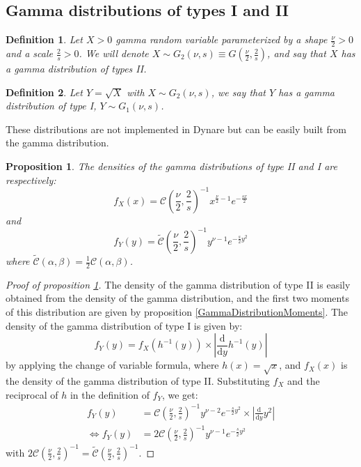 \documentclass{amsart}
\theoremstyle{plain}
\newtheorem{proposition}{Proposition}[section]
\newtheorem{definition}{Definition}[section]
\theoremstyle{remark}
\numberwithin{equation}{section}
\begin{document}
\subsection{Gamma distributions of types I and II}\label{subsec:GammaDistributionTypes}

\begin{definition}
  Let $X>0$ gamma random variable parameterized by a shape
  $\frac{\nu}{2}>0$ and a scale $\frac{2}{s}>0$. We will denote
  $X\sim G_2(\nu, s) \equiv G\left(\frac{\nu}{2}, \frac{2}{s}\right)$,
  and say that $X$ has a gamma distribution of types II.
\end{definition}

\begin{definition}
  Let $Y = \sqrt{X}$ with $X\sim G_2(\nu, s)$, we say that $Y$ has a
  gamma distribution of type I, $Y\sim G_1(\nu, s)$.
\end{definition}

These distributions are not implemented in Dynare but can be easily built from the gamma distribution.

 \begin{proposition}
   \label{GammaDistribution:type1and2:densities}
   The densities of the gamma distributions of type II and I are respectively:
   \[
     f_X(x) = \mathcal C\left(\frac{\nu}{2},\frac{2}{s}\right)^{-1}x^{\frac{\nu}{2}-1}e^{-\frac{sx}{2}}
   \]
   and
   \[
     f_Y(y) = \widetilde{\mathcal C}\left(\frac{\nu}{2},\frac{2}{s}\right)^{-1}y^{\nu-1}e^{-\frac{s}{2}y^2}
   \]
   where $\widetilde{\mathcal C}(\alpha,\beta) = \frac{1}{2}\mathcal C(\alpha,\beta)$.
 \end{proposition}

\begin{proof}[Proof of proposition \ref{GammaDistribution:type1and2:densities}]
  The density of the gamma distribution of type II is easily obtained
  from the density of the gamma distribution, and the first two
  moments of this distribution are given by proposition
  \ref{GammaDistributionMoments}. The density of the gamma
  distribution of type I is given by:
  \[
    f_Y(y) = f_X\left(h^{-1}(y)\right)\times \left|\frac{\mathrm d}{\mathrm d y}h^{-1}(y)\right|
  \]
  by applying the change of variable formula, where $h(x) = \sqrt{x}$,
  and $f_X(x)$ is the density of the gamma
  distribution of type II. Substituting $f_X$ and the reciprocal of $h$ in the
  definition of $f_Y$, we get:
  \[
    \begin{split}
      f_Y(y) &= \mathcal C\left(\frac{\nu}{2},\frac{2}{s}\right)^{-1}y^{\nu-2}e^{-\frac{s}{2}y^2}\times \left| \frac{\mathrm d}{\mathrm d y}y^2\right|\\
      \Leftrightarrow f_Y(y) &= 2\mathcal C\left(\frac{\nu}{2},\frac{2}{s}\right)^{-1}y^{\nu-1}e^{-\frac{s}{2}y^2}
    \end{split}
  \]
  with $2\mathcal C\left(\frac{\nu}{2},\frac{2}{s}\right)^{-1} = \widetilde{\mathcal C}\left(\frac{\nu}{2},\frac{2}{s}\right)^{-1}$.
\end{proof}
\end{document}
